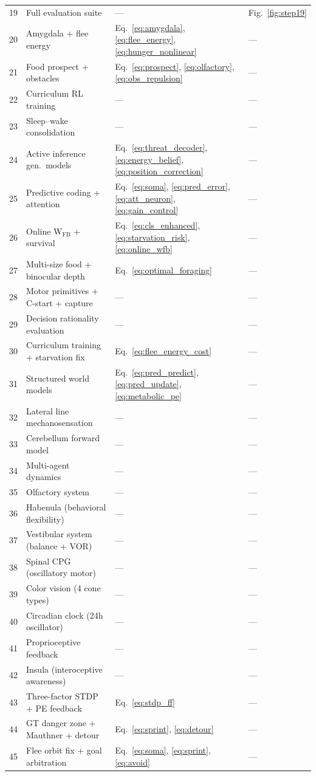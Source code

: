 \documentclass[11pt,a4paper]{article}
\begin{document}
\begin{table}[H]
\begin{tabular}{clll}
19 & Full evaluation suite  & ---                                    & Fig.~\ref{fig:step19} \\
20 & Amygdala + flee energy & Eq.~\ref{eq:amygdala}, \ref{eq:flee_energy}, \ref{eq:hunger_nonlinear} & --- \\
21 & Food prospect + obstacles & Eq.~\ref{eq:prospect}, \ref{eq:olfactory}, \ref{eq:obs_repulsion} & --- \\
22 & Curriculum RL training & ---                                    & --- \\
23 & Sleep--wake consolidation & ---                                 & --- \\
24 & Active inference gen.\ models & Eq.~\ref{eq:threat_decoder}, \ref{eq:energy_belief}, \ref{eq:position_correction} & --- \\
25 & Predictive coding + attention & Eq.~\ref{eq:soma}, \ref{eq:pred_error}, \ref{eq:att_neuron}, \ref{eq:gain_control} & --- \\
26 & Online W$_\text{FB}$ + survival & Eq.~\ref{eq:cls_enhanced}, \ref{eq:starvation_risk}, \ref{eq:online_wfb} & --- \\
27 & Multi-size food + binocular depth & Eq.~\ref{eq:optimal_foraging} & --- \\
28 & Motor primitives + C-start + capture & --- & --- \\
29 & Decision rationality evaluation & --- & --- \\
30 & Curriculum training + starvation fix & Eq.~\ref{eq:flee_energy_cost} & --- \\
31 & Structured world models & Eq.~\ref{eq:pred_predict}, \ref{eq:pred_update}, \ref{eq:metabolic_pe} & --- \\
32 & Lateral line mechanosensation & --- & --- \\
33 & Cerebellum forward model & --- & --- \\
34 & Multi-agent dynamics & --- & --- \\
35 & Olfactory system & --- & --- \\
36 & Habenula (behavioral flexibility) & --- & --- \\
37 & Vestibular system (balance + VOR) & --- & --- \\
38 & Spinal CPG (oscillatory motor) & --- & --- \\
39 & Color vision (4 cone types) & --- & --- \\
40 & Circadian clock (24h oscillator) & --- & --- \\
41 & Proprioceptive feedback & --- & --- \\
42 & Insula (interoceptive awareness) & --- & --- \\
43 & Three-factor STDP + PE feedback & Eq.~\ref{eq:stdp_ff} & --- \\
44 & GT danger zone + Mauthner + detour & Eq.~\ref{eq:sprint}, \ref{eq:detour} & --- \\
45 & Flee orbit fix + goal arbitration & Eq.~\ref{eq:soma}, \ref{eq:sprint}, \ref{eq:avoid} & --- \\
\bottomrule
\end{tabular}
\end{table}
\end{document}
